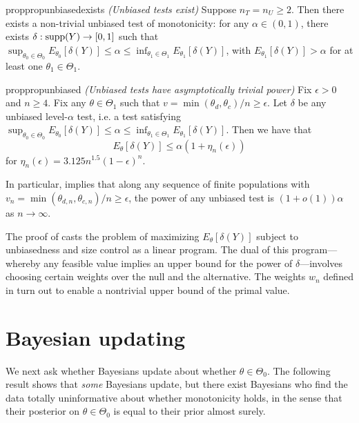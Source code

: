 \documentclass[12pt,reqno]{amsart}
\theoremstyle{theorem}
\theoremstyle{definition}
\newcommand{\0}{\mathbf{0}}
\newcommand{\1}{\mathbf{1}}
\begin{document}
\begin{restatable}{prop}{propunbiasedexists} \emph{(Unbiased tests exist)}
\label{prop:unbiasedexists}
Suppose $n_T=n_U \geq 2$. Then there exists a non-trivial unbiased test of monotonicity: for any $\alpha \in (0,1)$, there exists $\delta: \operatorname{supp}(Y) \to [0,1]$ such that $\sup_{\theta_0 \in \Theta_0} E_{\theta_0}[ \delta(Y) ] \leq \alpha \leq \inf_{\theta_1 \in \Theta_1} E_{\theta_1}[ \delta(Y) ]$, with $E_{\theta_1}[ \delta(Y) ] > \alpha$ for at least one $\theta_1 \in \Theta_1$. 
\end{restatable}


\begin{restatable}{prop}{propunbiased} \emph{(Unbiased tests have asymptotically trivial power)}
\label{prop:unbiased}
    Fix $\epsilon > 0$ and $n \geq 4$. Fix any  $\theta \in \Theta_{1}$ such that $v = \min
    (\theta_{d}, \theta_{c})/n \ge \epsilon$. Let $\delta$ be any unbiased level-$\alpha$ test, i.e. a test satisfying $\sup_{\theta_0 \in \Theta_0} E_{\theta_0}[\delta(Y)] \le \alpha \le \inf_{\theta_1 \in
        \Theta_1} E_{\theta_1}[\delta(Y)].$
    Then we have that
    \[
        E_{\theta}[\delta(Y)] \le \alpha (1 + \eta_n(\epsilon))
    \]
    for $\eta_n(\epsilon) = 3.125 n^{1.5} (1-\epsilon)^n$.
\end{restatable}

In particular,  implies that along any sequence of finite populations with $v_n = \min(\theta_{d,n}, \theta_{c,n})/n \ge \epsilon$, the power of any unbiased test is $(1+o(1)) \alpha$ as $n \rightarrow \infty$.

The proof of  casts the problem of maximizing $E_{\theta}[\delta(Y)]$
subject to unbiasedness and size control as a linear program. The dual of this
program---whereby any feasible value implies an upper bound for the power of
$\delta$---involves choosing certain weights over the null and the alternative. The weights
$w_n$ defined in  turn out to enable a nontrivial upper bound of the primal value.


\section{Bayesian updating}

We next ask whether Bayesians update about whether $\theta\in\Theta_0$. The following result shows that \emph{some} Bayesians update, but there exist Bayesians who find the data totally uninformative about whether monotonicity holds, in the sense that their posterior on $\theta \in \Theta_0$ is equal to their prior almost surely.
\end{document}
